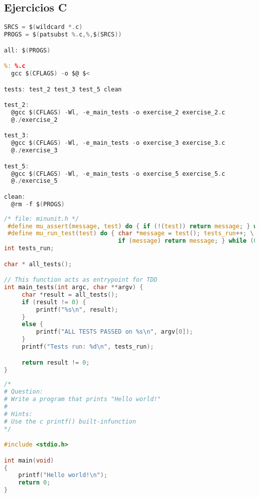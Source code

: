 \subsection{Ejercicios C}
\begin{lstlisting}[language=c,caption={Makefile},captionpos=b]
SRCS = $(wildcard *.c)
PROGS = $(patsubst %.c,%,$(SRCS))

all: $(PROGS)

%: %.c
  gcc $(CFLAGS) -o $@ $<

tests: test_2 test_3 test_5 clean

test_2:
  @gcc $(CFLAGS) -Wl, -e_main_tests -o exercise_2 exercise_2.c
  @./exercise_2

test_3:
  @gcc $(CFLAGS) -Wl, -e_main_tests -o exercise_3 exercise_3.c
  @./exercise_3

test_5:
  @gcc $(CFLAGS) -Wl, -e_main_tests -o exercise_5 exercise_5.c
  @./exercise_5

clean:
  @rm -f $(PROGS)
\end{lstlisting}

\begin{lstlisting}[language=c,caption={minunit.h},captionpos=b]
 /* file: minunit.h */
 #define mu_assert(message, test) do { if (!(test)) return message; } while (0)
 #define mu_run_test(test) do { char *message = test(); tests_run++; \
                                if (message) return message; } while (0)
int tests_run;

char * all_tests();

// This function acts as entrypoint for TDD
int main_tests(int argc, char **argv) {
     char *result = all_tests();
     if (result != 0) {
         printf("%s\n", result);
     }
     else {
         printf("ALL TESTS PASSED on %s\n", argv[0]);
     }
     printf("Tests run: %d\n", tests_run);

     return result != 0;
}
\end{lstlisting}

\begin{lstlisting}[language=c,caption={exercise\_1.c},captionpos=b]
/*
# Question:
# Write a program that prints "Hello world!"
#
# Hints:
# Use the c printf() built-infunction
*/

#include <stdio.h>

int main(void)
{
    printf("Hello world!\n");
    return 0;
}
\end{lstlisting}

